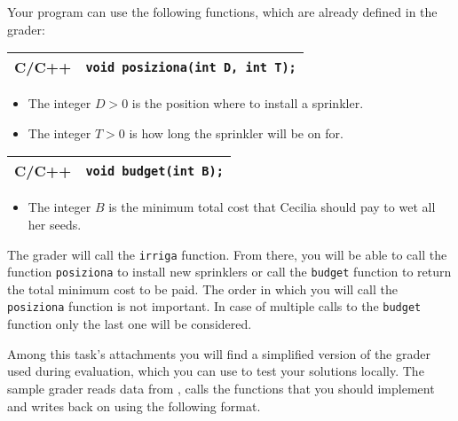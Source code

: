 Your program can use the following functions, which are already defined in the
grader:

\begin{center}\begin{tabularx}{\textwidth}{|c|X|}
\hline
C/C++  & \verb|void posiziona(int D, int T);|\\
\hline
\end{tabularx}\end{center}

\begin{itemize}[nolistsep]
  \item The integer $D > 0$ is the position where to install a sprinkler.
  \item The integer $T > 0$ is how long the sprinkler will be on for.
\end{itemize}

\medskip

\begin{center}\begin{tabularx}{\textwidth}{|c|X|}
\hline
C/C++  & \verb|void budget(int B);|\\
\hline
\end{tabularx}\end{center}

\begin{itemize}[nolistsep]
  \item The integer $B$ is the minimum total cost that Cecilia should pay to wet
  all her seeds.
\end{itemize}

\medskip

The grader will call the \texttt{irriga} function. From there, you will be able
to call the function \verb|posiziona| to install new sprinklers or call the
\verb|budget| function to return the total minimum cost to be paid. The order in
which you will call the \verb|posiziona| function is not important. In case of
multiple calls to the \verb|budget| function only the last one will be
considered.


\Grader

Among this task's attachments you will find a simplified version of the grader
used during evaluation, which you can use to test your solutions locally. The
sample grader reads data from , calls the functions that you should
implement and writes back on \outputfile{} using the following format.

